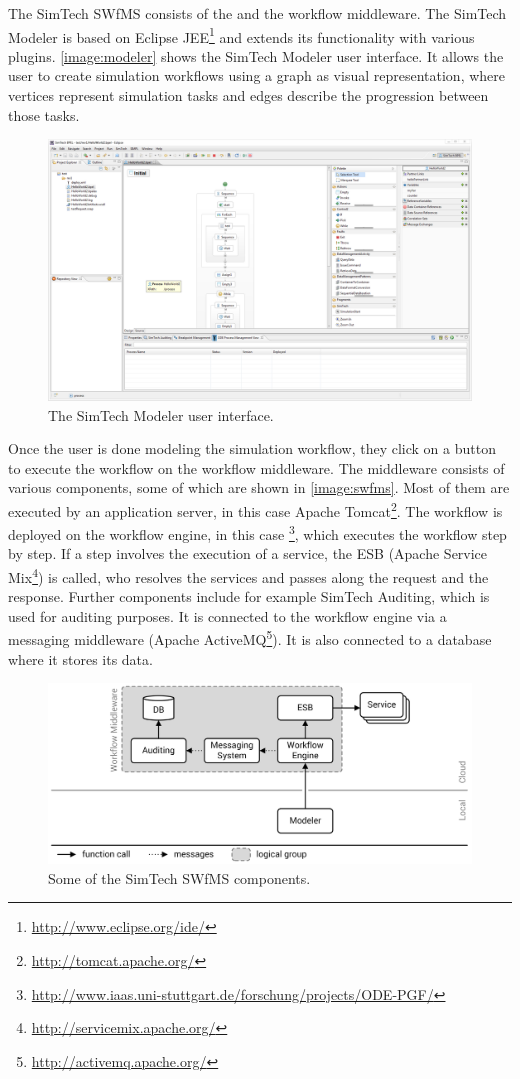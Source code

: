 The SimTech SWfMS consists of the  and the workflow middleware.
The SimTech Modeler is based on Eclipse JEE\footnote{\url{http://www.eclipse.org/ide/}} and extends its functionality with various plugins.
\autoref{image:modeler} shows the SimTech Modeler user interface.
It allows the user to create simulation workflows using a graph as visual representation, where vertices represent simulation tasks and edges describe the progression between those tasks.

\begin{figure}[!htbp]
	\centering
	\includegraphics[width=\textwidth,interpolate=false]{fundamentals/assets/simtech_modeler}
	\caption{The SimTech Modeler user interface.}
	\label{image:modeler}
\end{figure}

Once the user is done modeling the simulation workflow, they click on a button to execute the workflow on the workflow middleware.
The middleware consists of various components, some of which are shown in \autoref{image:swfms}.
Most of them are executed by an application server, in this case Apache Tomcat\footnote{\url{http://tomcat.apache.org/}}.
The workflow is deployed on the workflow engine, in this case \footnote{\url{http://www.iaas.uni-stuttgart.de/forschung/projects/ODE-PGF/}}, which executes the workflow step by step.
If a step involves the execution of a service, the ESB (Apache Service Mix\footnote{\url{http://servicemix.apache.org/}}) is called, who resolves the services and passes along the request and the response.
Further components include for example SimTech Auditing, which is used for auditing purposes.
It is connected to the workflow engine via a messaging middleware (Apache ActiveMQ\footnote{\url{http://activemq.apache.org/}}).
It is also connected to a database where it stores its data.

\begin{figure}[!htbp]
	\centering
	\includegraphics[width=\textwidth,interpolate=false]{fundamentals/assets/unmodified_architecture}
	\caption{Some of the SimTech SWfMS components.}
	\label{image:swfms}
\end{figure}
